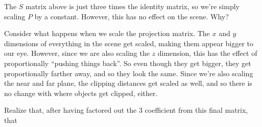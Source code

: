\documentclass[11pt]{tingpset}
\begin{document}
    The $S$ matrix above is just three times the identity matrix, so we're simply scaling $P$ by a constant. However, this has no effect on the scene. Why?

    Consider what happens when we scale the projection matrix. The $x$ and $y$ dimensions of everything in the scene get scaled, making them appear bigger to our eye. However, since we are also scaling the $z$ dimension, this has the effect of proportionally ``pushing things back''. So even though they get bigger, they get proportionally farther away, and so they look the same. Since we're also scaling the near and far plane, the clipping distances get scaled as well, and so there is no change with where objects get clipped, either.

  \problem
    Realize that, after having factored out the 3 coefficient from this final matrix, that

  \problem

  \todo

  \problem

  \todo

  \problem

  \todo

  \problem

  \todo
\end{document}
